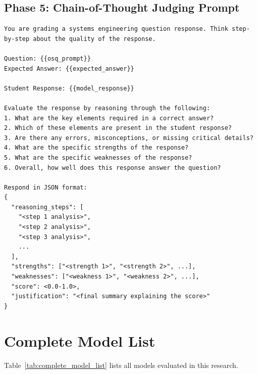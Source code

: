\subsection{Phase 5: Chain-of-Thought Judging Prompt}

\begin{lstlisting}[basicstyle=\small\ttfamily,breaklines=true]
You are grading a systems engineering question response. Think step-by-step about the quality of the response.

Question: {{osq_prompt}}
Expected Answer: {{expected_answer}}

Student Response: {{model_response}}

Evaluate the response by reasoning through the following:
1. What are the key elements required in a correct answer?
2. Which of these elements are present in the student response?
3. Are there any errors, misconceptions, or missing critical details?
4. What are the specific strengths of the response?
5. What are the specific weaknesses of the response?
6. Overall, how well does this response answer the question?

Respond in JSON format:
{
  "reasoning_steps": [
    "<step 1 analysis>",
    "<step 2 analysis>",
    "<step 3 analysis>",
    ...
  ],
  "strengths": ["<strength 1>", "<strength 2>", ...],
  "weaknesses": ["<weakness 1>", "<weakness 2>", ...],
  "score": <0.0-1.0>,
  "justification": "<final summary explaining the score>"
}
\end{lstlisting}

\section{Complete Model List}\label{app:model_list}

Table~\ref{tab:complete_model_list} lists all models evaluated in this research.

